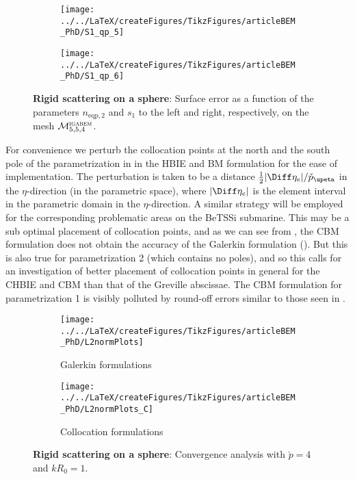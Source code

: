 \begin{figure}
	\centering
	\begin{subfigure}[t]{0.49\textwidth}
		\centering
		\texttt{[image: ../../LaTeX/createFigures/TikzFigures/articleBEM\_PhD/S1\_qp\_5]}
	\end{subfigure}%
	\hspace*{0.02\textwidth}%
	\begin{subfigure}[t]{0.49\textwidth}
		\centering
		\texttt{[image: ../../LaTeX/createFigures/TikzFigures/articleBEM\_PhD/S1\_qp\_6]}
	\end{subfigure}
	\caption{\textbf{Rigid scattering on a sphere}: Surface error as a function of the parameters $n_{\mathrm{eqp},2}$ and $s_1$ to the left and right, respectively, on the mesh ${\cal M}_{5,5,4}^{\textsc{igabem}}$.}
	\label{Fig3:S1_qp_M5p5}
\end{figure}

For convenience we perturb the collocation points at the north and the south pole of the parametrization in  in the HBIE and BM formulation for the ease of implementation. The perturbation is taken to be a distance $\frac12|\Diff\eta_e|/\check{p}_\upeta$ in the $\eta$-direction (in the parametric space), where $|\Diff\eta_e|$ is the element interval in the parametric domain in the $\eta$-direction. A similar strategy will be employed for the corresponding problematic areas on the BeTSSi submarine. This may be a sub optimal placement of collocation points, and as we can see from , the CBM formulation does not obtain the accuracy of the Galerkin formulation (). But this is also true for parametrization 2 (which contains no poles), and so this calls for an investigation of better placement of collocation points in general for the CHBIE and CBM than that of the Greville abscissae. The CBM formulation for parametrization 1 is visibly polluted by round-off errors similar to those seen in .
\begin{figure}
	\centering
	\begin{subfigure}[t]{\textwidth}
		\centering
		\texttt{[image: ../../LaTeX/createFigures/TikzFigures/articleBEM\_PhD/L2normPlots]}
		\caption{Galerkin formulations}
		\label{Fig3:S1parmCompG}
	\end{subfigure}
	\par\bigskip
	\par\bigskip
	\begin{subfigure}[t]{\textwidth}
		\centering
		\texttt{[image: ../../LaTeX/createFigures/TikzFigures/articleBEM\_PhD/L2normPlots\_C]}
		\caption{Collocation formulations}
		\label{Fig3:S1parmCompC}
	\end{subfigure}
	\caption{\textbf{Rigid scattering on a sphere}: Convergence analysis with $\check{p}=4$ and $kR_0=1$.}
	\label{Fig3:S1parmComp}
\end{figure}

